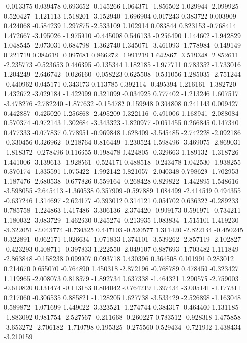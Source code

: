 -0.013375
0.039478
0.693652
-0.145266
1.064371
-1.856502
1.029944
-2.099925
0.520427
-1.121113
1.518201
-3.152940
-1.696904
0.017243
0.383722
0.003909
0.424068
-0.584239
1.297875
-2.533109
0.102914
0.083844
0.823153
-0.768414
1.472667
-3.195026
-1.975910
-0.445008
0.546133
-0.256490
1.144602
-1.942829
1.048545
-2.073031
0.684798
-1.362740
1.345071
-3.461093
-1.778984
-0.149149
0.221719
0.384619
-0.097681
0.866272
-0.991219
1.642867
-3.519348
-2.852611
-2.235773
-0.523653
0.446395
-0.135344
1.182185
-1.977711
0.783352
-1.733016
1.204249
-2.646742
-0.026160
-0.058223
0.625508
-0.531056
1.285035
-2.751244
-0.440962
0.045171
0.343173
0.113785
0.392114
-0.495394
1.216161
-1.382720
1.432672
-3.029184
-1.422099
0.321099
-0.034925
0.777402
-1.213246
1.607517
-3.478276
-2.782240
-1.877632
-0.154782
0.159948
0.304808
0.241143
0.009427
0.442887
-0.425020
1.256868
-2.495209
0.322116
-0.491006
1.168941
-2.088084
0.570374
-0.972143
1.302684
-3.343323
-1.820977
-0.061455
0.266845
0.147340
0.477333
-0.077837
0.778951
-0.969848
1.628409
-3.545485
-2.742228
-2.092186
-0.330456
0.326962
-0.218764
0.816449
-1.230524
1.598496
-3.469075
-2.869031
-1.818372
-0.278496
0.116655
0.198478
0.424805
-0.329663
1.189132
-1.318726
1.441006
-3.139613
-1.928561
-0.524171
0.488518
-0.243478
1.042530
-1.938255
0.870174
-1.835591
1.075422
-1.992142
0.821057
-2.040348
0.798629
-1.702953
1.187476
-2.680538
-0.677826
0.559164
-0.268428
0.829822
-1.442895
1.548616
-3.598055
-2.645413
-1.360538
0.357909
-0.597889
1.084499
-2.414549
0.494355
-0.637246
1.314697
-2.624177
-0.393012
0.314121
0.054702
0.636322
-0.289233
0.785758
-1.224863
1.417486
-3.306136
-2.374420
-0.909173
0.591971
-0.734211
1.180032
-3.083729
-1.462630
0.245274
-0.213935
1.083834
-1.515101
1.419230
-3.322051
-2.043774
-0.730325
0.447103
-0.520577
1.311420
-2.822134
-0.450245
0.322891
-0.062171
1.026634
-1.071833
1.374101
-3.539262
-2.857119
-2.102827
-0.423293
0.408711
-0.397833
1.222550
-2.049107
0.887693
-1.703482
1.111849
-2.863848
-0.158238
0.099907
0.093718
0.430396
0.364508
0.101991
0.283012
0.214670
0.655070
-0.764890
1.450318
-2.872196
-0.768789
0.478450
-0.323427
1.119965
-2.008073
0.818579
-1.892734
0.637338
-1.464321
1.290575
-2.759003
-0.610820
0.131474
-0.113153
0.804042
-0.764219
1.397434
-3.005141
-1.177311
0.217060
-0.306535
0.885821
-1.128205
1.627738
-3.533429
-2.526898
-1.163048
0.589872
-1.071699
1.449022
-3.323521
-1.274744
0.384317
-0.464460
1.131185
-1.883092
0.981754
-2.527567
-0.211668
-0.260227
0.783512
-0.928318
1.475858
-3.653272
-2.706182
-1.710798
0.195325
-0.275560
0.529434
-0.721902
1.438434
-3.210159
